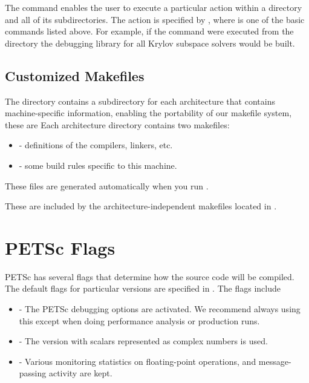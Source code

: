 {{{The  command enables the user to execute a particular action
within a directory and all of its subdirectories.  The action is specified
by , where  is one of the basic commands
listed above. For example, if the command
were executed from the directory 
the debugging library for all Krylov subspace solvers would be built.

\subsection{Customized Makefiles}
\label{sec_custom}

The directory  contains a subdirectory for each
architecture that contains machine-specific information, enabling the
portability of our makefile system, these are 
 Each architecture directory contains
two makefiles:
\begin{itemize}
\item {} - definitions of the compilers, linkers, etc.
\item {} - some build rules specific to this machine.
\end{itemize}
These files are generated automatically when you run .

These are included by the architecture-independent makefiles located in
.

\section{PETSc Flags}
\label{sec_makeflags}

PETSc has several flags that determine how the source code will be
compiled.  The default flags for particular versions are specified in
.
The flags include
\begin{itemize}
\item {} - The PETSc debugging options are activated. We
      recommend always using this except when doing performance analysis or production runs. 
\item {} - The version with scalars represented
      as complex numbers is used. 
\item {} - Various monitoring statistics on floating-point operations,
      and message-passing activity are kept. 
\end{itemize}

}}}
